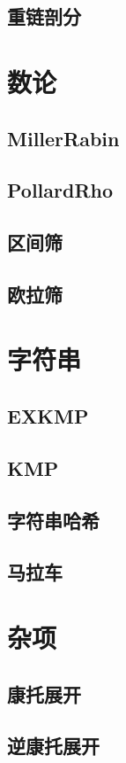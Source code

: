 \documentclass{article}
\begin{document}
\begin{multicols*}{2}
\subsection{重链剖分}

\section{数论}
\subsection{MillerRabin}

\subsection{PollardRho}

\subsection{区间筛}

\subsection{欧拉筛}

\section{字符串}
\subsection{EXKMP}

\subsection{KMP}

\subsection{字符串哈希}

\subsection{马拉车}

\section{杂项}
\subsection{康托展开}

\subsection{逆康托展开}

\end{multicols*}
\end{document}
